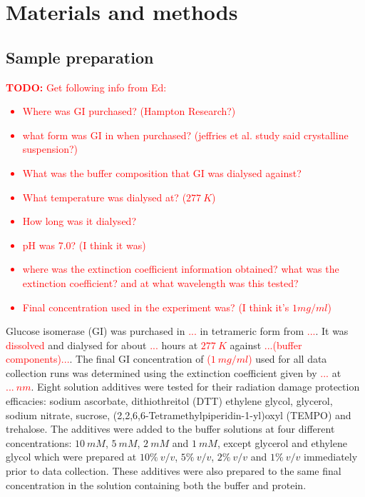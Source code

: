 \section{Materials and methods}
\label{sec:Materials and methods}

\subsection{Sample preparation}
\label{sub:Sample preparation}
\textcolor{red}{
    \begin{myenumerate}
        \item \hypertarget{todo:Need info from Ed}{\textbf{TODO:} Get following info from Ed:}
        \begin{itemize}
            \item Where was GI purchased? (Hampton Research?)
            \item what form was GI in when purchased? (jeffries et al. study said crystalline suspension?)
            \item What was the buffer composition that GI was dialysed against?
            \item What temperature was dialysed at? ($277\ K$)
            \item How long was it dialysed?
            \item pH was 7.0? (I think it was)
            \item where was the extinction coefficient information obtained? what was the extinction coefficient? and at what wavelength was this tested?
            \item Final concentration used in the experiment was? (I think it's $1 mg/ml$)
        \end{itemize}
    \end{myenumerate}
}
Glucose isomerase (GI) was purchased in \textcolor{red}{...} in tetrameric form from \textcolor{red}{...}.
It was \textcolor{red}{dissolved} and dialysed for about \textcolor{red}{...} hours at \textcolor{red}{$277\ K$} against \textcolor{red}{...(buffer components)...}.
The final GI concentration of \textcolor{red}{($1\ mg/ml$)} used for all data collection runs was determined using the extinction coefficient given by \textcolor{red}{...} at \textcolor{red}{$...\ nm$}.
Eight solution additives were tested for their radiation damage protection efficacies: sodium ascorbate, dithiothreitol (DTT) ethylene glycol, glycerol, sodium nitrate, sucrose, (2,2,6,6-Tetramethylpiperidin-1-yl)oxyl (TEMPO) and trehalose.
The additives were added to the buffer solutions at four different concentrations: $10\ mM$, $5\ mM$, $2\ mM$ and $1\ mM$, except glycerol and ethylene glycol which were prepared at $10\%\ v/v$, $5\%\ v/v$, $2\%\ v/v$ and $1\%\ v/v$ immediately prior to data collection.
These additives were also prepared to the same final concentration in the solution containing both the buffer and protein.

